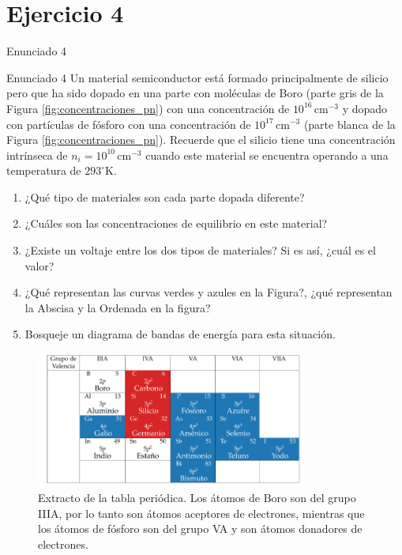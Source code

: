 \documentclass[
    10pt,
    aspectratio=169,
    xcolor={dvipsnames},
    spanish,
    ]{beamer}
\begin{document}
\section{Ejercicio 4}
\begin{frame}{Enunciado 4}
  \begin{block}{Enunciado 4}
  Un material semiconductor está formado principalmente de silicio pero que ha sido dopado en una parte con moléculas de Boro (parte gris de la Figura \ref{fig:concentraciones_pn}) con una concentración de $10^{16}\,\text{cm}^{-3}$ y dopado con partículas de fósforo con una concentración de $10^{17}\,\text{cm}^{-3}$ (parte blanca de la Figura \ref{fig:concentraciones_pn}). Recuerde que el silicio tiene una concentración intrínseca de $n_i = 10^{10}\,\text{cm}^{-3}$ cuando este material se encuentra operando a una temperatura de $293^\circ \text{K}$.

\begin{enumerate}
    \item ¿Qué tipo de materiales son cada parte dopada diferente?
    \item ¿Cuáles son las concentraciones de equilibrio en este material?
    \item ¿Existe un voltaje entre los dos tipos de materiales? Si es así, ¿cuál es el valor?
    \item ¿Qué representan las curvas verdes y azules en la Figura?, ¿qué representan la Abscisa y la Ordenada en la figura?
    \item Bosqueje un diagrama de bandas de energía para esta situación.
\end{enumerate}
\end{block}
\end{frame}
\begin{frame}
  \begin{figure}[H]
        \centering
        \includegraphics[width=0.8\textwidth]{../figures/Auxiliar_2_8.png}
        \caption{Extracto de la tabla periódica. Los átomos de Boro son del grupo IIIA, por lo tanto son átomos aceptores de electrones, mientras que los átomos de fósforo son del grupo VA y son átomos donadores de electrones.}
        \label{fig:tabla_periodica}
    \end{figure}
\end{frame}
\end{document}
